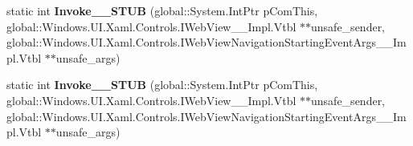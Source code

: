 \begin{DoxyCompactItemize}
\mbox{\label{struct_windows_1_1_foundation_1_1_typed_event_handler___a___windows___u_i___xaml___controls___we35912db850c22c9b2be1a07564605cd2_a2b5b6141258b864cbaa459d76cee888c}} 
static int {\bfseries Invoke\+\_\+\+\_\+\+S\+T\+UB} (global\+::\+System.\+Int\+Ptr p\+Com\+This, global\+::\+Windows.\+U\+I.\+Xaml.\+Controls.\+I\+Web\+View\+\_\+\+\_\+\+Impl.\+Vtbl $\ast$$\ast$unsafe\+\_\+sender, global\+::\+Windows.\+U\+I.\+Xaml.\+Controls.\+I\+Web\+View\+Navigation\+Starting\+Event\+Args\+\_\+\+\_\+\+Impl.\+Vtbl $\ast$$\ast$unsafe\+\_\+args)
\item 
\mbox{\label{struct_windows_1_1_foundation_1_1_typed_event_handler___a___windows___u_i___xaml___controls___we35912db850c22c9b2be1a07564605cd2_a2b5b6141258b864cbaa459d76cee888c}} 
static int {\bfseries Invoke\+\_\+\+\_\+\+S\+T\+UB} (global\+::\+System.\+Int\+Ptr p\+Com\+This, global\+::\+Windows.\+U\+I.\+Xaml.\+Controls.\+I\+Web\+View\+\_\+\+\_\+\+Impl.\+Vtbl $\ast$$\ast$unsafe\+\_\+sender, global\+::\+Windows.\+U\+I.\+Xaml.\+Controls.\+I\+Web\+View\+Navigation\+Starting\+Event\+Args\+\_\+\+\_\+\+Impl.\+Vtbl $\ast$$\ast$unsafe\+\_\+args)
\end{DoxyCompactItemize}
